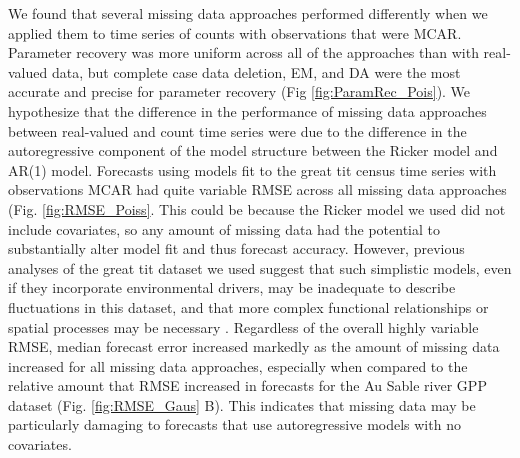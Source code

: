 \documentclass{article}
\begin{document}
 We found that several missing data approaches performed differently when we applied them to time series of counts with observations that were MCAR. Parameter recovery was more uniform across all of the approaches than with real-valued data, but complete case data deletion, EM, and DA were the most accurate and precise for parameter recovery (Fig \ref{fig:ParamRec_Pois}). %
We hypothesize that the difference in the performance of missing data approaches between real-valued and count time series were due to the difference in the autoregressive component of the model structure between the Ricker model and AR(1) model.%
Forecasts using models fit to the great tit census time series with observations MCAR had quite variable RMSE across all missing data approaches (Fig. \ref{fig:RMSE_Poiss}. This could be because the Ricker model we used did not include covariates, so any amount of missing data had the potential to substantially alter model fit and thus forecast accuracy. However, previous analyses of the great tit dataset we used suggest that such simplistic models, even if they incorporate environmental drivers, may be inadequate to describe fluctuations in this dataset, and that more complex functional relationships or spatial processes may be necessary \citep{lebreton1990modelling}. Regardless of the overall highly variable RMSE, median forecast error increased markedly as the amount of missing data increased for all missing data approaches, especially when compared to the relative amount that RMSE increased in forecasts for the Au Sable river GPP dataset (Fig. \ref{fig:RMSE_Gaus} B). This indicates that missing data may be particularly damaging to forecasts that use autoregressive models with no covariates. 
         
\end{document}
